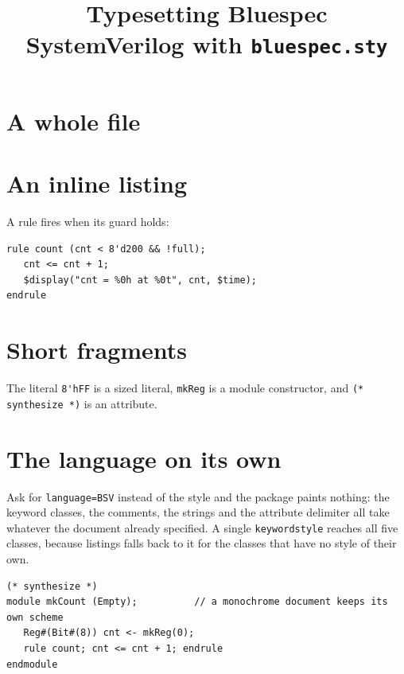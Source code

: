 \documentclass[a4paper]{article}
\title{Typesetting Bluespec SystemVerilog with \texttt{bluespec.sty}}
\author{}
\date{}
\begin{document}
\maketitle

\lstset{basicstyle=\ttfamily\small, columns=fullflexible, keepspaces=true}

\section*{A whole file}



\section*{An inline listing}

A rule fires when its guard holds:
%
\begin{lstlisting}[style=bsv]
rule count (cnt < 8'd200 && !full);
   cnt <= cnt + 1;
   $display("cnt = %0h at %0t", cnt, $time);
endrule
\end{lstlisting}

\section*{Short fragments}

The literal \lstinline[style=bsv]|8'hFF| is a sized literal,
\lstinline[style=bsv]|mkReg| is a module constructor, and
\lstinline[style=bsv]|(* synthesize *)| is an attribute.

\section*{The language on its own}

Ask for \texttt{language=BSV} instead of the style and the package paints
nothing: the keyword classes, the comments, the strings and the attribute
delimiter all take whatever the document already specified. A single
\texttt{keywordstyle} reaches all five classes, because listings falls back to
it for the classes that have no style of their own.
%
\begin{lstlisting}[language=BSV, keywordstyle=\bfseries, commentstyle=\itshape]
(* synthesize *)
module mkCount (Empty);          // a monochrome document keeps its own scheme
   Reg#(Bit#(8)) cnt <- mkReg(0);
   rule count; cnt <= cnt + 1; endrule
endmodule
\end{lstlisting}
\end{document}

